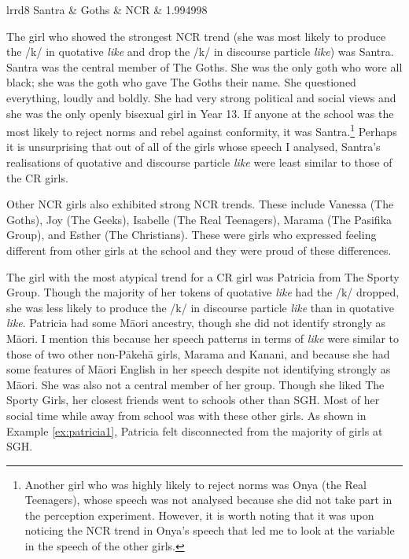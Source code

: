 \begin{table}[htbp]
\begin{center}
\begin{tabular}{lrrd{8}}
Santra	& Goths     & NCR    & 1.994998\\
   \lspbottomrule
\end{tabular}
\caption{Likelihood of an individual producing /k/ in discourse particle \textit{like} compared to quotative \textit{like}. Estimates are based on a separate model fit to the production data modelling the likelihood of /k/ realisation, with an interaction between the random effect of a speaker and whether the token was the quotative or the discourse particle. The presented estimate for each speaker is the difference between random coefficients when the token is a discourse particle and when it is a quotative.}
\label{tab:indiv}
\end{center}
\end{table}


The girl who showed the strongest NCR trend (she was most likely to produce the /k/ in quotative \textit{like} and drop the /k/ in discourse particle \textit{like}) was Santra. Santra was the central member of The Goths. She was the only goth who wore all black; she was the goth who gave The Goths their name. She questioned everything, loudly and boldly. She had very strong political and social views and she was the only openly bisexual girl in Year 13. If anyone at the school was the most likely to reject norms and rebel against conformity, it was Santra.\footnote{Another girl who was highly likely to reject norms was Onya (the Real Teenagers), whose speech was not analysed because she did not take part in the perception experiment. However, it is worth noting that it was upon noticing the NCR trend in Onya's speech that led me to look at the variable in the speech of the other girls.} Perhaps it is unsurprising that out of all of the girls whose speech I analysed, Santra's realisations of quotative and discourse particle \textit{like} were least similar to those of the CR girls.

Other NCR girls also exhibited strong NCR trends. These include Va\-nessa (The Goths), Joy (The Geeks), Isa\-belle (The Real Teen\-agers), Ma\-rama (The Pasifika Group), and Esther (The Christians). These were girls who expressed feeling different from other girls at the school and they were proud of these differences. 

The girl with the most atypical trend for a CR girl was Patricia from The Sporty Group. Though the majority of her tokens of quotative \textit{like} had the /k/ dropped, she was less likely to produce the /k/ in discourse particle \textit{like} than in quotative \textit{like}. Patricia had some M\=aori ancestry, though she did not identify strongly as M\=aori. I mention this because her speech patterns in terms of \textit{like} were similar to those of two other non-P\=akeh\=a girls, Marama and Kanani, and because she had some features of M\=aori English in her speech despite not identifying strongly as M\=aori. She was also not a central member of her group. Though she liked The Sporty Girls, her closest friends went to schools other than SGH. Most of her social time while away from school was with these other girls. As shown in Example \ref{ex:patricia1}, Patricia felt disconnected from the majority of girls at SGH.


